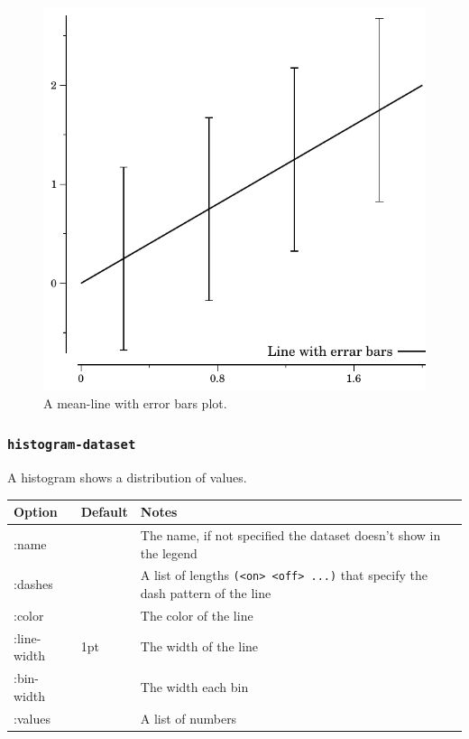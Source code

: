 \documentclass{article}
\begin{document}
\begin{figure}[t]
\begin{center}
\includegraphics{line_err}
\caption{\label{fig:line_err}A mean-line with error bars plot.}
\end{center}
\end{figure}

\subsubsection{\tt histogram-dataset}

A histogram shows a distribution of values.

\begin{center}
\begin{tabular}{lll}
Option & Default & Notes \\
\hline
:name & & The name, if not specified the dataset doesn't show in
the legend\\
:dashes & & A list of lengths {\tt (<on> <off> ...)} that specify the
dash pattern of the line\\
:color & & The color of the line\\
:line-width & 1pt & The width of the line\\
:bin-width &  & The width each bin\\
:values & & A list of numbers\\
\end{tabular}
\end{center}
\end{document}
